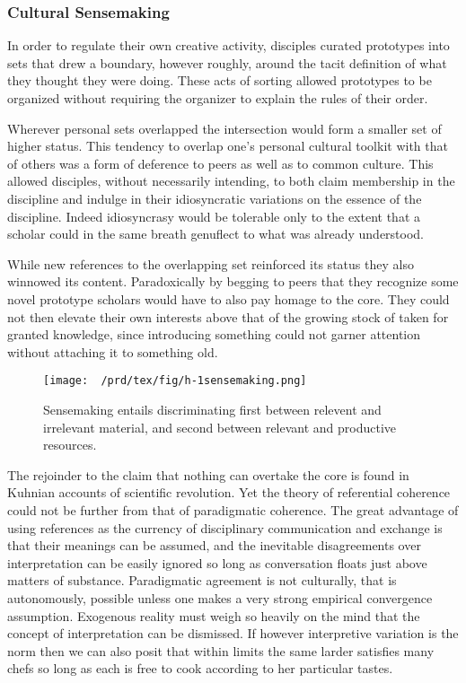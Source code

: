 \subsubsection{Cultural Sensemaking}\label{cultural-sensemaking}

In order to regulate their own creative activity, disciples curated
prototypes into sets that drew a boundary, however roughly, around the
tacit definition of what they thought they were doing. These acts of
sorting allowed prototypes to be organized without requiring the
organizer to explain the rules of their order.

Wherever personal sets overlapped the intersection would form a smaller
set of higher status. This tendency to overlap one's personal cultural
toolkit with that of others was a form of deference to peers as well as
to common culture. This allowed disciples, without necessarily
intending, to both claim membership in the discipline and indulge in
their idiosyncratic variations on the essence of the discipline. Indeed
idiosyncrasy would be tolerable only to the extent that a scholar could
in the same breath genuflect to what was already understood.

While new references to the overlapping set reinforced its status they
also winnowed its content. Paradoxically by begging to peers that they
recognize some novel prototype scholars would have to also pay homage to
the core. They could not then elevate their own interests above that of
the growing stock of taken for granted knowledge, since introducing
something could not garner attention without attaching it to something
old.

\begin{figure}[htbp]
\centering
\texttt{[image: ~/prd/tex/fig/h-1sensemaking.png]}
\caption{Sensemaking entails discriminating first between relevent and
irrelevant material, and second between relevant and productive
resources.}
\end{figure}

The rejoinder to the claim that nothing can overtake the core is found
in Kuhnian accounts of scientific revolution. Yet the theory of
referential coherence could not be further from that of paradigmatic
coherence. The great advantage of using references as the currency of
disciplinary communication and exchange is that their meanings can be
assumed, and the inevitable disagreements over interpretation can be
easily ignored so long as conversation floats just above matters of
substance. Paradigmatic agreement is not culturally, that is
autonomously, possible unless one makes a very strong empirical
convergence assumption. Exogenous reality must weigh so heavily on the
mind that the concept of interpretation can be dismissed. If however
interpretive variation is the norm then we can also posit that within
limits the same larder satisfies many chefs so long as each is free to
cook according to her particular tastes.

